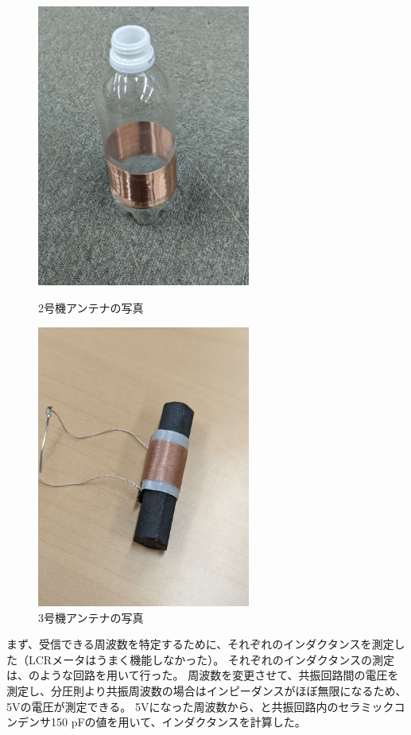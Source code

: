 \documentclass[report.tex]{subfiles}
\begin{document}
\begin{figure}[H]
	\begin{minipage}[b]{0.5\linewidth}
		\centering
		\includegraphics[width=7cm]{fig/2.jpg}
		\caption{2号機アンテナの写真}
		\label{fig:2}
	\end{minipage}
	\begin{minipage}[b]{0.5\linewidth}
		\centering
		\includegraphics[width=7cm]{fig/3.jpg}
		\caption{3号機アンテナの写真}
		\label{fig:3}
	\end{minipage}
\end{figure}

まず、受信できる周波数を特定するために、それぞれのインダクタンスを測定した（LCRメータはうまく機能しなかった）。
それぞれのインダクタンスの測定は、のような回路を用いて行った。
周波数を変更させて、共振回路間の電圧を測定し、分圧則より共振周波数の場合はインピーダンスがほぼ無限になるため、5Vの電圧が測定できる。
5Vになった周波数から、と共振回路内のセラミックコンデンサ150 pFの値を用いて、インダクタンスを計算した。
\end{document}
